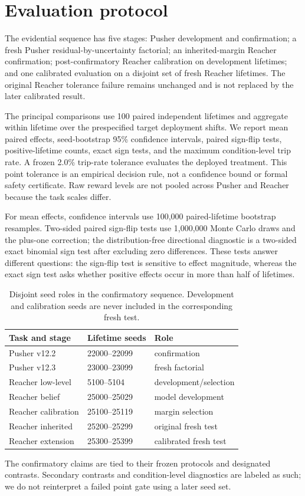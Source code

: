\section{Evaluation protocol}
\label{sec:evaluation}

The evidential sequence has five stages: Pusher development and confirmation;
a fresh Pusher residual-by-uncertainty factorial; an inherited-margin Reacher
confirmation; post-confirmatory Reacher calibration on development lifetimes;
and one calibrated evaluation on a disjoint set of fresh Reacher lifetimes.
The original Reacher tolerance failure remains unchanged and is not replaced by
the later calibrated result.

The principal comparisons use 100 paired independent lifetimes and aggregate
within lifetime over the prespecified target deployment shifts. We report mean
paired effects, seed-bootstrap 95\% confidence intervals, paired sign-flip
tests, positive-lifetime counts, exact sign tests, and the maximum
condition-level trip rate. A frozen 2.0\% trip-rate tolerance evaluates the
deployed treatment. This point tolerance is an empirical decision rule, not a
confidence bound or formal safety certificate. Raw reward levels are not
pooled across Pusher and Reacher because the task scales differ.

For mean effects, confidence intervals use 100,000 paired-lifetime bootstrap
resamples. Two-sided paired sign-flip tests use 1,000,000 Monte Carlo draws and
the plus-one correction; the distribution-free directional diagnostic is a
two-sided exact binomial sign test after excluding zero differences. These
tests answer different questions: the sign-flip test is sensitive to effect
magnitude, whereas the exact sign test asks whether positive effects occur in
more than half of lifetimes.

\begin{table}[t]
  \centering
  \small
  \caption{Disjoint seed roles in the confirmatory sequence. Development and
  calibration seeds are never included in the corresponding fresh test.}
  \label{tab:seed-roles}
  \begin{tabular}{lll}
    \toprule
    Task and stage & Lifetime seeds & Role \\
    \midrule
    Pusher v12.2 & 22000--22099 & confirmation \\
    Pusher v12.3 & 23000--23099 & fresh factorial \\
    Reacher low-level & 5100--5104 & development/selection \\
    Reacher belief & 25000--25029 & model development \\
    Reacher calibration & 25100--25119 & margin selection \\
    Reacher inherited & 25200--25299 & original fresh test \\
    Reacher extension & 25300--25399 & calibrated fresh test \\
    \bottomrule
  \end{tabular}
\end{table}

The confirmatory claims are tied to their frozen protocols and designated
contrasts. Secondary contrasts and condition-level diagnostics are labeled as
such; we do not reinterpret a failed point gate using a later seed set.
